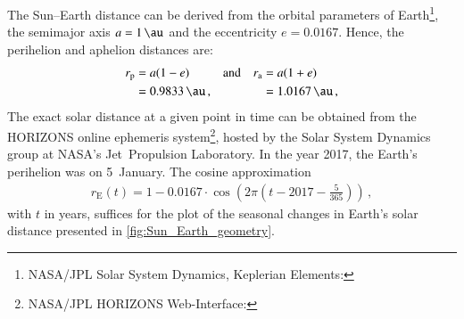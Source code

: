 The Sun--Earth distance can be derived from the orbital parameters of Earth\footnote{NASA/JPL Solar System Dynamics, Keplerian Elements: }, the semimajor axis $a = \SI{1}{\au}$ and the eccentricity $e = \num{0.0167}$. Hence, the perihelion and aphelion distances are:
\begin{align*}
	r_\text{p} &= a (1 - e)	&	&\text{and}	&	r_\text{a} &= a (1 + e)\\
		&= \SI{0.9833}{\au}	\,,	&	&	&	&= \SI{1.0167}{\au}	\,,
\end{align*}
The exact solar distance at a given point in time can be obtained from the HORIZONS online ephemeris system\footnote{NASA/JPL HORIZONS Web-Interface: }, hosted by the Solar System Dynamics group at NASA's Jet~Propulsion Laboratory. In the year 2017, the Earth's perihelion was on 5~January.
The cosine approximation
\begin{align}
	r_\text{E}(t) = 1 - 0.0167 \cdot \cos\left(2 \pi \left(t - 2017 - \frac{5}{365}\right)\right)\,,
\end{align}
with $t$ in years, suffices for the plot of the seasonal changes in Earth's solar distance presented in \autoref{fig:Sun_Earth_geometry}.
\begin{figure}[htb]
\end{figure}
